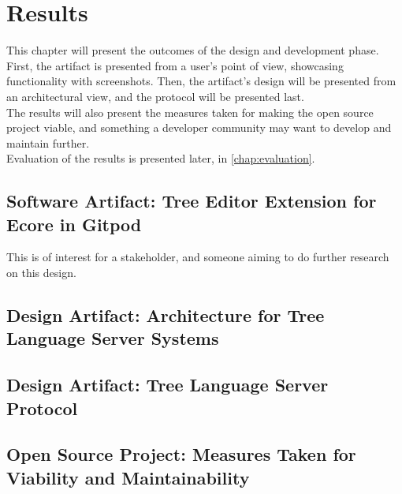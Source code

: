 \chapter{Results}\label{chap:results}

This chapter will present the outcomes of the design and development phase.
First, the artifact is presented from a user's point of view, showcasing functionality with screenshots.
Then, the artifact's design will be presented from an architectural view, and the protocol will be presented last.\\

The results will also present the measures taken for making the \gls{open source} project viable, and something a developer community may want to develop and maintain further.\\

Evaluation of the results is presented later, in \cref{chap:evaluation}.

\section{Software Artifact: Tree Editor Extension for Ecore in Gitpod}

This is of interest for a stakeholder, and someone aiming to do further research on this design.




\section{Design Artifact: Architecture for Tree Language Server Systems}




\section{Design Artifact: Tree Language Server Protocol}\label{sec:tlsp}




\section{Open Source Project: Measures Taken for Viability and Maintainability}


